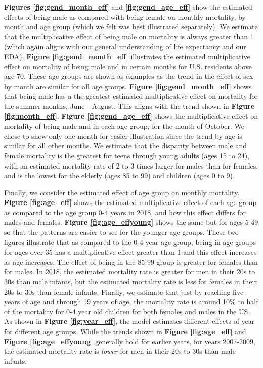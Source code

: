 \documentclass[letterpaper, 11pt]{article}
\begin{document}
\textbf{Figures \ref{fig:gend_month_eff}} and \textbf{\ref{fig:gend_age_eff}} show the estimated effects of being male as compared with being female on monthly mortality, by month and age group (which we felt was best illustrated separately). We estimate that the multiplicative effect of being male on mortality is always greater than 1 (which again aligns with our general understanding of life expectancy and our EDA). \textbf{Figure \ref{fig:gend_month_eff}} illustrates the estimated multiplicative effect on mortality of being male and in certain months for U.S. residents above age 70. These age groups are shown as examples as the trend in the effect of sex by month are similar for all age groups. \textbf{Figure \ref{fig:gend_month_eff}} shows that being male has a the greatest estimated multiplicative effect on mortality for the summer months, June - August. This aligns with the trend shown in \textbf{Figure \ref{fig:month_eff}}. \textbf{Figure \ref{fig:gend_age_eff}} shows the multiplicative effect on mortality of being male and in each age group, for the month of October. We chose to show only one month for easier illustration since the trend by age is similar for all other months. We estimate that the disparity between male and female mortality is the greatest for teens through young adults (ages 15 to 24), with an estimated mortality rate of 2 to 3 times larger for males than for females, and is the lowest for the elderly (ages 85 to 99) and children (ages 0 to 9).




Finally, we consider the estimated effect of age group on monthly mortality. \textbf{Figure \ref{fig:age_eff}} shows the estimated multiplicative effect of each age group as compared to the age group 0-4 years in 2018, and how this effect differs for males and females. \textbf{Figure \ref{fig:age_effyoung}} shows the same but for ages 5-49 so that the patterns are easier to see for the younger age groups. These two figures illustrate that as compared to the 0-4 year age group, being in age groups for ages over 35 has a multiplicative effect greater than 1 and this effect increases as age increases. The effect of being in the 85-99 group is greater for females than for males. In 2018, the estimated mortality rate is greater for men in their 20s to 30s than male infants, but the estimated mortality rate is less for females in their 20s to 30s than female infants. Finally, we estimate that just by reaching five years of age and through 19 years of age, the mortality rate is around 10\% to half of the mortality for 0-4 year old children for both females and males in the US. As shown in \textbf{Figure \ref{fig:year_eff}}, the model estimates different effects of year for different age groups. While the trends shown in \textbf{Figure \ref{fig:age_eff}} and \textbf{Figure \ref{fig:age_effyoung}} generally hold for earlier years, for years 2007-2009, the estimated mortality rate is \textit{lower} for men in their 20s to 30s than male infants.
\end{document}
